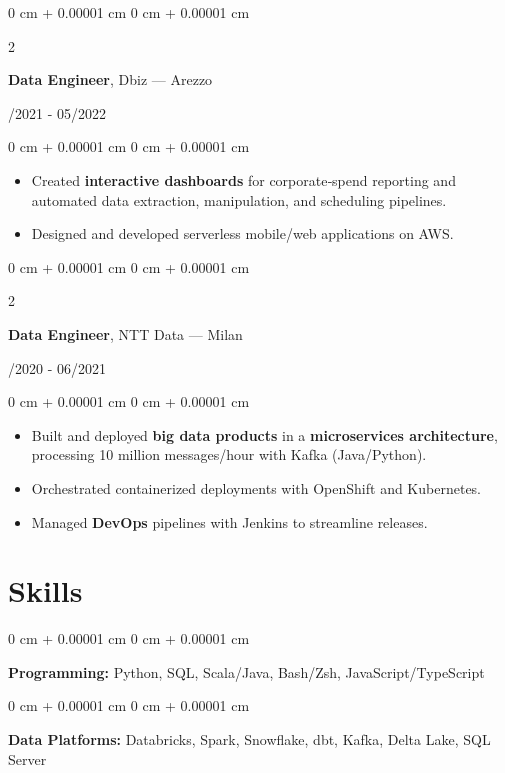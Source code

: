 \documentclass[10pt, letterpaper]{article}
\newenvironment{highlights}{
    \begin{itemize}[
        topsep=0.10 cm,
        parsep=0.10 cm,
        partopsep=0pt,
        itemsep=0pt,
        leftmargin=0 cm + 10pt
    ]
}{
    \end{itemize}
} %
\newenvironment{onecolentry}{
    \begin{adjustwidth}{
        0 cm + 0.00001 cm
    }{
        0 cm + 0.00001 cm
    }
}{
    \end{adjustwidth}
} %
\newenvironment{twocolentry}[2][]{
    \onecolentry
    \def\secondColumn{#2}
    \setcolumnwidth{\fill, 4.5 cm}
    \begin{paracol}{2}
}{
    \switchcolumn \raggedleft \secondColumn
    \end{paracol}
    \endonecolentry
} %
\begin{document}
\vspace{0.2 cm}

\begin{twocolentry}{06/2021 - 05/2022}
    \textbf{Data Engineer}, Dbiz — Arezzo
\end{twocolentry}
\begin{onecolentry}
    \begin{highlights}
        \item Created \textbf{interactive dashboards} for corporate‑spend reporting and automated data extraction, manipulation, and scheduling pipelines.
        \item Designed and developed serverless mobile/web applications on AWS.
    \end{highlights}
\end{onecolentry}

\vspace{0.2 cm}

\begin{twocolentry}{06/2020 - 06/2021}
    \textbf{Data Engineer}, NTT Data — Milan
\end{twocolentry}
\begin{onecolentry}
    \begin{highlights}
        \item Built and deployed \textbf{big data products} in a \textbf{microservices architecture}, processing 10 million messages/hour with Kafka (Java/Python).
        \item Orchestrated containerized deployments with OpenShift and Kubernetes.
        \item Managed \textbf{DevOps} pipelines with Jenkins to streamline releases.
    \end{highlights}
\end{onecolentry}

\section{Skills}

\begin{onecolentry}
    \textbf{Programming:} Python, SQL, Scala/Java, Bash/Zsh, JavaScript/TypeScript
\end{onecolentry}

\vspace{0.2 cm}

\begin{onecolentry}
    \textbf{Data Platforms:} Databricks, Spark, Snowflake, dbt, Kafka, Delta Lake, SQL Server
\end{onecolentry}
\end{document}
